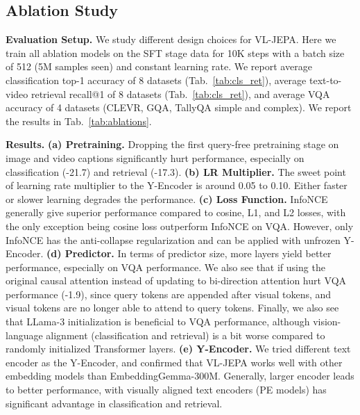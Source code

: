 \subsection{Ablation Study}
\label{sec:exp.ablations}

\textbf{Evaluation Setup.} We study different design choices for VL-JEPA. Here we train all ablation models on the SFT stage data for 10K steps with a batch size of 512 (5M samples seen) and constant learning rate. We report average classification top-1 accuracy of 8 datasets (Tab.~\ref{tab:cls_ret}), average text-to-video retrieval recall@1 of 8 datasets (Tab.~\ref{tab:cls_ret}), and {average VQA accuracy of 4 datasets (CLEVR, GQA, TallyQA simple and complex). We report the results in Tab.~\ref{tab:ablations}.}

\textbf{Results.} 
{\textbf{(a) Pretraining.} 
    Dropping the first query-free pretraining stage on image and video captions significantly hurt performance, especially on classification (-21.7) and retrieval (-17.3). 
\textbf{(b) LR Multiplier.} 
    The sweet point of learning rate multiplier to the Y-Encoder is around 0.05 to 0.10. Either faster or slower learning degrades the performance.
\textbf{(c) Loss Function.} 
    InfoNCE generally give superior performance compared to cosine, L1, and L2 losses, with the only exception being cosine loss outperform InfoNCE on VQA. However, only InfoNCE has the anti-collapse regularization and can be applied with unfrozen Y-Encoder.}
\textbf{(d) Predictor.} 
    In terms of predictor size, more layers yield better performance, especially on VQA performance. We also see that if using the original causal attention instead of updating to bi-direction attention hurt VQA performance (-1.9), since query tokens are appended after visual tokens, and visual tokens are no longer able to attend to query tokens. Finally, we also see that LLama-3 initialization is beneficial to VQA performance, although vision-language alignment (classification and retrieval) is a bit worse compared to randomly initialized Transformer layers.
{\textbf{(e) Y-Encoder.} 
    We tried different text encoder as the Y-Encoder, and confirmed that VL-JEPA works well with other embedding models than EmbeddingGemma-300M. Generally, larger encoder leads to better performance, with visually aligned text encoders (PE models) has significant advantage in classification and retrieval.}


